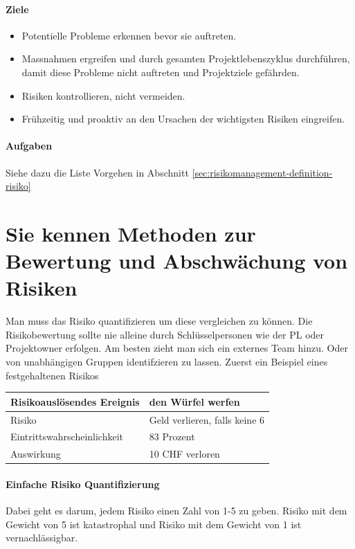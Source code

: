 \paragraph{Ziele}
\begin{itemize}
	\item Potentielle Probleme erkennen bevor sie auftreten.
	\item Massnahmen ergreifen und durch gesamten Projektlebenszyklus durchführen, damit diese Probleme nicht auftreten und Projektziele gefährden.
	\item Risiken kontrollieren, nicht vermeiden.
	\item Frühzeitig und proaktiv an den Ursachen der wichtigsten Risiken eingreifen.
\end{itemize}

\paragraph{Aufgaben}
Siehe dazu die Liste Vorgehen in Abschnitt \ref{sec:risikomanagement-definition-risiko}


\section{Sie kennen Methoden zur Bewertung und Abschwächung von Risiken}

Man muss das Risiko quantifizieren um diese vergleichen zu können. Die Risikobewertung sollte nie alleine durch Schlüsselpersonen wie der PL oder Projektowner erfolgen. Am besten zieht man sich ein externes Team hinzu. Oder von unabhängigen Gruppen identifzieren zu lassen. Zuerst ein Beispiel eines festgehaltenen Risikos \\

\begin{tabular}{|p{7cm}|p{7cm}|}
	\hline Risikoauslösendes Ereignis &  den Würfel werfen \\ 
	\hline Risiko & Geld verlieren, falls keine 6  \\ 
	\hline Eintrittswahrscheinlichkeit & 83 Prozent \\ 
	\hline Auswirkung & 10 CHF verloren \\ 
	\hline 
\end{tabular}

\paragraph{Einfache Risiko Quantifizierung}
Dabei geht es darum, jedem Risiko einen Zahl von 1-5 zu geben. Risiko mit dem Gewicht von 5 ist katastrophal und Risiko mit dem Gewicht von 1 ist vernachlässigbar.

